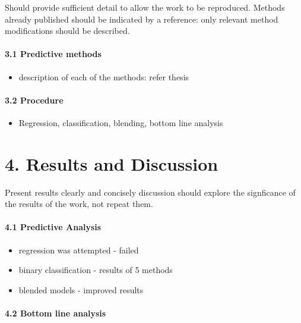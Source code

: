 \documentclass[]{elsarticle} %
\providecommand{\tightlist}{%
  \setlength{\itemsep}{0pt}\setlength{\parskip}{0pt}}
\begin{document}
Should provide sufficient detail to allow the work to be reproduced.
Methods already published should be indicated by a reference: only
relevant method modifications should be described.

\paragraph{3.1 Predictive methods}\label{predictive-methods}

\begin{itemize}
\tightlist
\item
  description of each of the methods: refer thesis
\end{itemize}

\paragraph{3.2 Procedure}\label{procedure}

\begin{itemize}
\tightlist
\item
  Regression, classification, blending, bottom line analysis
\end{itemize}

\section{4. Results and Discussion}\label{results-and-discussion}

Present results clearly and concisely discussion should explore the
signficance of the results of the work, not repeat them.

\paragraph{4.1 Predictive Analysis}\label{predictive-analysis}

\begin{itemize}
\item
  regression was attempted - failed
\item
  binary classification - results of 5 methods
\item
  blended models - improved results
\end{itemize}

\paragraph{4.2 Bottom line analysis}\label{bottom-line-analysis}
\end{document}

